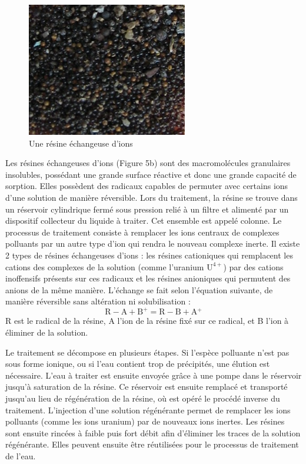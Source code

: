 \documentclass{article}
\begin{document}
\begin{figure}[H]
\centering
\includegraphics[]{III_A_2.png}
\caption{Une résine échangeuse d'ions}
\label{fig:resine_echangeuse_ions}
\end{figure}

Les résines échangeuses d’ions (Figure 5b) sont des macromolécules granulaires insolubles, possédant une grande surface réactive et donc une grande capacité de sorption. Elles possèdent des radicaux capables de permuter avec certains ions d’une solution de manière réversible. Lors du traitement, la résine se trouve dans un réservoir cylindrique fermé sous pression relié à un filtre et alimenté par un dispositif collecteur du liquide à traiter. Cet ensemble est appelé colonne. Le processus de traitement consiste à remplacer les ions centraux de complexes polluants par un autre type d’ion qui rendra le nouveau complexe inerte. Il existe 2 types de résines échangeuses d’ions : les résines cationiques qui remplacent les cations des complexes de la solution (comme l’uranium $\text{U}^{4+}$) par des cations inoffensifs présents sur ces radicaux et les résines anioniques qui permutent des anions de la même manière. L’échange se fait selon l’équation suivante, de manière réversible sans altération ni solubilisation :
$$\text{R}\!-\!\text{A}\!\! + \text{B}^+ = \text{R}\!-\!\text{B}\! + \text{A}\!^+$$
R est le radical de la résine, A l’ion de la résine fixé sur ce radical, et B l’ion à éliminer de la solution.

Le traitement se décompose en plusieurs étapes. Si l’espèce polluante n’est pas sous forme ionique, ou si l’eau contient trop de précipités, une élution est nécessaire. L’eau à traiter est ensuite envoyée grâce à une pompe dans le réservoir jusqu’à saturation de la résine. Ce réservoir est ensuite remplacé et transporté jusqu’au lieu de régénération de la résine, où est opéré le procédé inverse du traitement. L’injection d’une solution régénérante permet de remplacer les ions polluants (comme les ions uranium) par de nouveaux ions inertes. Les résines sont ensuite rincées à faible puis fort débit afin d’éliminer les traces de la solution régénérante. Elles peuvent ensuite être réutilisées pour le processus de traitement de l’eau.
\end{document}
